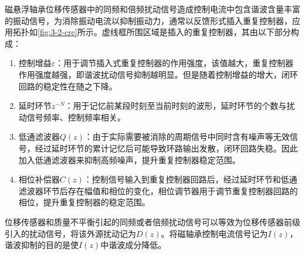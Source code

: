 \documentclass[
  lang=cn,
  degree=master,
  openany,oneside
]{nuaathesis}
\begin{document}
磁悬浮轴承位移传感器中的同频和倍频扰动信号造成控制电流中包含谐波含量丰富的振动信号，为消除振动电流以抑制振动力，通常以反馈形式插入重复控制器，应用拓扑如\autoref{fig:3-2-crc}所示。虚线框所围区域是插入的重复控制器，其由以下部分构成：
\begin{enumerate}
	\item 控制增益$\varepsilon $：用于调节插入式重复控制器的作用强度，该值越大，重复控制器作用强度越强，即谐波扰动信号抑制越明显。但是随着控制增益的增大，闭环回路的稳定性在随之下降。
	\item 延时环节${z^{ - N}}$：用于记忆前某段时刻至当前时刻的波形，延时环节的个数与扰动信号频率、控制频率相关。
	\item 低通滤波器$Q(z)$：由于实际需要被消除的周期信号中同时含有噪声等无效信号，经过延时环节的累计记忆后可能导致环路输出发散，闭环回路失稳。因此加入低通滤波器来抑制高频噪声，提升重复控制器稳定范围。
	\item 相位补偿器$C(z)$：控制信号输入到重复控制器回路后，经过延时环节和低通滤波器环节后存在幅值和相位的变化，相位调节器用于调节重复控制器回路的相位，提升重复控制器的稳定范围。
\end{enumerate}

位移传感器和质量不平衡引起的同频或者倍频扰动信号可以等效为位移传感器前级引入的扰动信号，将该外源扰动记为$D(z)$。将磁轴承控制电流信号记为$I(z)$，谐波抑制的目的是使$I(z)$中谐波成分降低。
\end{document}
